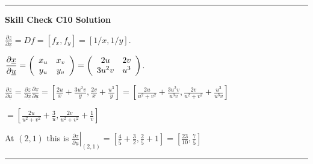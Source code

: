 \documentclass[12pt,letterpaper,noanswers]{exam}
\begin{document}
\vspace{0.2cm}
\hrule
\vspace{0.2cm}

\noindent\textbf{Skill Check C10 Solution}

$\displaystyle\frac{\partial z}{\partial\underline{x}} = Df = [f_x, f_y] = [1/x, 1/y]$.
\vspace{0.2cm}

$\displaystyle\frac{\partial \underline{x}}{\partial\underline{u}} = \left(\begin{array}{c c} x_u & x_v \\ y_u & y _v\end{array}\right) = \left(\begin{array}{c c} 2u & 2v \\ 3u^2v & u^3 \end{array}\right)$.
\vspace{0.2cm}

$\displaystyle\frac{\partial z}{\partial\underline{u}} = \frac{\partial z}{\partial\underline{x}}\frac{\partial \underline{x}}{\partial\underline{u}} = \left[\frac{2u}{x}+\frac{3u^2v}{y}, \frac{2v}{x}+\frac{u^3}{y}\right] = \left[\frac{2u}{u^2+v^2} + \frac{3u^2v}{u^3v}, \frac{2v}{u^2+v^2}+\frac{u^3}{u^3v}\right] $

\hfill$\displaystyle= \left[\frac{2u}{u^2+v^2} + \frac{3}{u}, \frac{2v}{u^2+v^2}+\frac{1}{v}\right]$
\vspace{0.2cm}

At $(2,1)$ this is $\displaystyle\left.\frac{\partial z}{\partial\underline{u}} \right\vert_{(2,1)} = \left[\frac{4}{5} + \frac{3}{2}, \frac{2}{5}+1\right] = \left[\frac{23}{10}, \frac{7}{5}\right]$


\vspace{0.2cm}
\hrule
\vspace{0.2cm}








\end{document}
